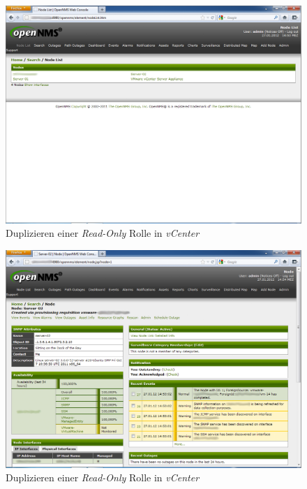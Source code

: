 \begin{figure}[H]
	\centering
	\includegraphics[width=1.0\textwidth]{images/3rd-party/vmware/7-nodes}
	\caption{Duplizieren einer \emph{Read-Only} Rolle in \emph{vCenter}}
	\label{pic:vmware-nodes}
\end{figure}

\begin{figure}[H]
	\centering
	\includegraphics[width=1.0\textwidth]{images/3rd-party/vmware/8-detail}
	\caption{Duplizieren einer \emph{Read-Only} Rolle in \emph{vCenter}}
	\label{pic:vmware-detail}
\end{figure}


